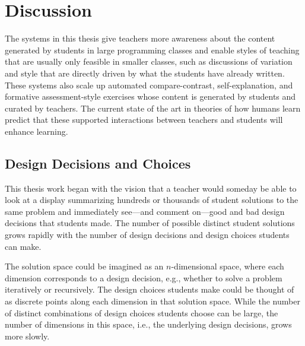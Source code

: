 \chapter{Discussion}\label{chapter:discussion}

The systems in this thesis give teachers more awareness about the content generated by students in large programming classes and enable styles of teaching that are usually only feasible in smaller classes, such as discussions of variation and style that are directly driven by what the students have already written. These systems also scale up automated compare-contrast, self-explanation, and formative assessment-style exercises whose content is generated by students and curated by teachers.  The current state of the art in theories of how humans learn predict that these supported interactions between teachers and students will enhance learning.


\section{Design Decisions and Choices}


This thesis work began with the vision that a teacher would someday be able to look at a display summarizing hundreds or thousands of student solutions to the same problem and immediately see---and comment on---good and bad design decisions that students made. The number of possible distinct student solutions grows rapidly with the number of design decisions and design choices students can make. 

The solution space could be imagined as an $n$-dimensional space, where each dimension corresponds to a design decision, e.g., whether to solve a problem iteratively or recursively. The design choices students make could be thought of as discrete points along each dimension in that solution space. While the number of distinct combinations of design choices students choose can be large, the number of dimensions in this space, i.e., the underlying design decisions, grows more slowly. 

